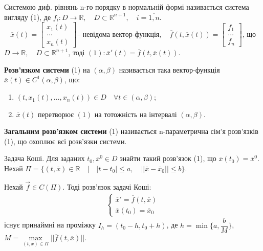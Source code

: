 \documentclass[14pt,a4paper]{scrartcl}
\theoremstyle{definition}
\theoremstyle{definition}
\theoremstyle{definition}
\begin{document}
 Системою диф. рівнянь n-го порядку в нормальній формі називається система вигляду (1), де $ f_i : D \to \mathbb{R}, \quad D \subset \mathbb{R}^{n+1 }, \quad i = \overline{1, n}$.
\look
\[
      \overline{x}(t) = \left[\begin{array}{l}
      x_1(t)    \\
      \dots     \\
      x_n(t)
      \end{array}\right] \text{-- невідома вектор-функція}, \quad
      \overline{f}(t, \overline{x}(t)) = \left[\begin{array}{l}
      f_1     \\
      \dots  \\
      f_n
      \end{array}\right] \text{, що}
\]
$D \rightarrow \mathbb{R}, \quad D \subset \mathbb{R}^{n+1}$, тоді $(1): \overline{x}'(t) = \overline{f}(t, \overline{x}(t))$.


\def\rect{\textbf{П}}
\bd
\textbf{Розв'язком системи} (1) на $(\alpha , \beta)$ називається така вектор-функція $\overline{x} (t) \in C^1(\alpha , \beta)$, що:
\begin{enumerate}
  \item $(t, x_1(t), \dots, x_n(t)) \in D \quad \forall t \in (\alpha, \beta)$;
  \item $\overline{x}(t)$  перетворює $(1)$ на тотожність на інтервалі $(\alpha, \beta)$.
\end{enumerate}

\textbf{Загальним розв'язком системи}  (1) називається n-параметрична сім'я розв'язків (1), що охоплює всі розв'язки системи.
\ed

Задача Коші. Для заданих $t_0, \overline{x}^{0} \in D$ знайти такий розв'язок (1), що $\overline{x} (t_0) = \overline{x}^{0}$.
Нехай $\Pi = \{(t, \overline{x}) \in \mathbb{R} \quad \big| \quad |t-t_0| \leq a, \quad ||\overline{x} - \overline{x}_0|| \leq b \}$.

\begin{boxteo}
Нехай $\vec{f} \in C(\Pi)$. Тоді розв'язок задачі Коші:
\begin{gather*}
  \begin{cases}
    \overline{x}' = \overline{f}(t, \overline{x}) \\
    \overline{x}(t_0) = \overline{x}_0
  \end{cases}
\end{gather*}
існує принаймні на проміжку $I_h = (t_0 - h, t_0 + h)$, де $h = \min\{{a, \dfrac{b}{M}}\}$, \\ $M = \max\limits_{(t, x) \in \Pi} {||\overline{f}(t, \overline{x})||}$.
\end{boxteo}
\end{document}
